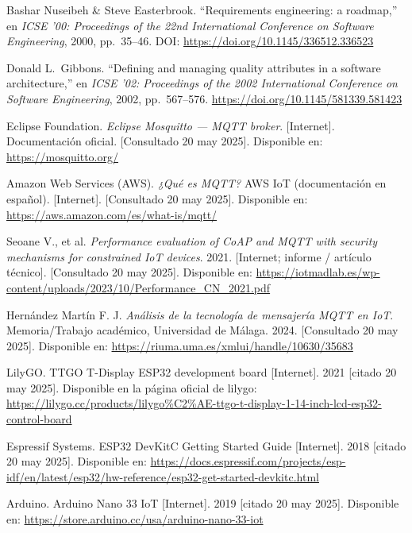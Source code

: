 \documentclass[12pt, a4paper]{article}
\begin{document}
\begin{thebibliography}{9}
	Bashar Nuseibeh \& Steve Easterbrook.  
	``Requirements engineering: a roadmap,''  
	en \textit{ICSE '00: Proceedings of the 22nd International Conference on Software Engineering}, 2000, pp.~35--46.  
	DOI: \url{https://doi.org/10.1145/336512.336523}
	
	Donald L.\ Gibbons.  
	``Defining and managing quality attributes in a software architecture,''  
	en \textit{ICSE '02: Proceedings of the 2002 International Conference on Software Engineering}, 2002, pp.~567--576.  
	\url{https://doi.org/10.1145/581339.581423}
	


	Eclipse Foundation. \textit{Eclipse Mosquitto — MQTT broker}. [Internet].
	Documentación oficial. [Consultado 20 may 2025]. Disponible en: \url{https://mosquitto.org/}
	
	Amazon Web Services (AWS). \textit{¿Qué es MQTT?} AWS IoT (documentación en español). [Internet]. [Consultado 20 may 2025]. Disponible en: \url{https://aws.amazon.com/es/what-is/mqtt/}
	
	Seoane V., et al. \textit{Performance evaluation of CoAP and MQTT with security mechanisms for constrained IoT devices}. 2021. [Internet; informe / artículo técnico]. [Consultado 20 may 2025]. Disponible en: \url{https://iotmadlab.es/wp-content/uploads/2023/10/Performance_CN_2021.pdf}
	
	Hernández Martín F. J. \textit{Análisis de la tecnología de mensajería MQTT en IoT}. Memoria/Trabajo académico, Universidad de Málaga. 2024. [Consultado 20 may 2025]. Disponible en: \url{https://riuma.uma.es/xmlui/handle/10630/35683}

	
	LilyGO. TTGO T-Display ESP32 development board [Internet]. 2021 [citado 20 may 2025]. Disponible en la página oficial de lilygo: \url{https://lilygo.cc/products/lilygo%C2%AE-ttgo-t-display-1-14-inch-lcd-esp32-control-board}
	
	Espressif Systems. ESP32 DevKitC Getting Started Guide [Internet]. 2018 [citado 20 may 2025]. Disponible en: \url{https://docs.espressif.com/projects/esp-idf/en/latest/esp32/hw-reference/esp32-get-started-devkitc.html}
	

	
	Arduino. Arduino Nano 33 IoT [Internet]. 2019 [citado 20 may 2025]. Disponible en: \url{https://store.arduino.cc/usa/arduino-nano-33-iot}



\end{thebibliography}
\end{document}
